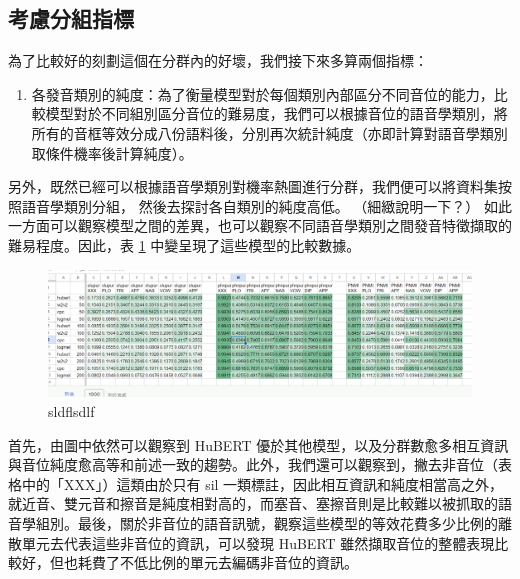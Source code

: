 \subsection{考慮分組指標}


{
}



        為了比較好的刻劃這個在分群內的好壞，我們接下來多算兩個指標：\par
\begin{enumerate}
    \item 各發音類別的純度：為了衡量模型對於每個類別內部區分不同音位的能力，比較模型對於不同組別區分音位的難易度，我們可以根據音位的語音學類別，將所有的音框等效分成八份語料後，分別再次統計純度（亦即計算對語音學類別取條件機率後計算純度）。
\end{enumerate}




        另外，既然已經可以根據語音學類別對機率熱圖進行分群，我們便可以將資料集按照語音學類別分組， 然後去探討各自類別的純度高低。 （細緻說明一下？） 如此一方面可以觀察模型之間的差異，也可以觀察不同語音學類別之間發音特徵擷取的難易程度。因此，表 \ref{sdfsdf} 中變呈現了這些模型的比較數據。

 \begin{figure}
     \centering
     \includegraphics[width=0.5\linewidth]{figures/lll.png}
     \caption{sldflsdlf}
     \label{sdfsdf}
 \end{figure}

        首先，由圖中依然可以觀察到 HuBERT 優於其他模型，以及分群數愈多相互資訊與音位純度愈高等和前述一致的趨勢。此外，我們還可以觀察到，撇去非音位（表格中的「XXX」）這類由於只有 sil 一類標註，因此相互資訊和純度相當高之外，就近音、雙元音和擦音是純度相對高的，而塞音、塞擦音則是比較難以被抓取的語音學組別。最後，關於非音位的語音訊號，觀察這些模型的等效花費多少比例的離散單元去代表這些非音位的資訊，可以發現 HuBERT 雖然擷取音位的整體表現比較好，但也耗費了不低比例的單元去編碼非音位的資訊。


